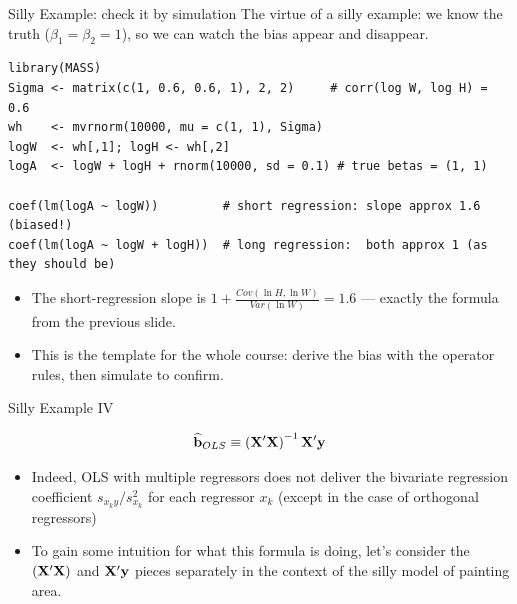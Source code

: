 \documentclass[aspectratio=169,11pt]{beamer}
\begin{document}
\begin{frame}[fragile]{Silly Example: check it by simulation}
The virtue of a silly example: we \alert{know} the truth ($\beta_1 = \beta_2 = 1$), so we can
watch the bias appear and disappear.
\begin{lstlisting}
library(MASS)
Sigma <- matrix(c(1, 0.6, 0.6, 1), 2, 2)     # corr(log W, log H) = 0.6
wh    <- mvrnorm(10000, mu = c(1, 1), Sigma)
logW  <- wh[,1]; logH <- wh[,2]
logA  <- logW + logH + rnorm(10000, sd = 0.1) # true betas = (1, 1)

coef(lm(logA ~ logW))         # short regression: slope approx 1.6 (biased!)
coef(lm(logA ~ logW + logH))  # long regression:  both approx 1 (as they should be)
\end{lstlisting}
\begin{itemize}
	\item The short-regression slope is $1 + \frac{Cov(\ln H, \ln W)}{Var(\ln W)} = 1.6$ --- exactly the formula from the previous slide.
	\item This is the template for the whole course: \alert{derive} the bias with the operator rules, then \alert{simulate} to confirm.
\end{itemize}
\end{frame}

\begin{frame}{Silly Example IV}

	\[
	\widehat{{\bf b}}_{OLS} \equiv  \left({\bf X}'{\bf X}\right)^{-1} {\bf X}' {\bf y} 
	\]


	\begin{itemize}
	\item Indeed, OLS with multiple regressors does not deliver 
	the bivariate regression coefficient $s_{x_{k}y}/s_{x_{k}}^{2}$ for each regressor $x_{k}$
	(except in the case of orthogonal regressors)

	\bigskip
	\item To gain some intuition for what this formula is doing, let's consider the $ \left({\bf X}'{\bf X}\right)$
	and ${\bf X}' {\bf y} $ pieces separately in the context of the silly model of painting area.


\end{itemize}
\end{frame}
\end{document}
